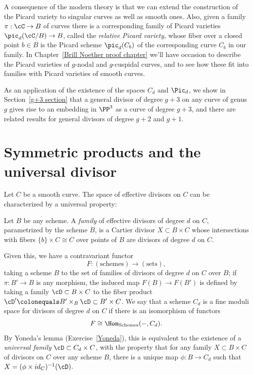 A consequence of the modern theory is that we can extend the
%
construction of the Picard variety to singular curves as well as smooth
ones. Also, given a family $\pi : \cC \to B$ of curves there is a
corresponding family of Picard varieties $\pic_d(\cC/B) \to B$, called
the
\emph{relative Picard variety,}
%
 whose
fiber over a closed point $b\in B$ is the Picard scheme $\pic_d(C_b)$
of the corresponding curve $C_b$ in our family.
In Chapter~\ref{Brill Noether proof chapter} we'll have occasion to
describe the Picard varieties of $g$-nodal and $g$-cuspidal curves, and
to see how these fit into families with Picard varieties of smooth curves.

As an application of the existence of the spaces $C_d$ and $\Pic_d$, we show in Section~\ref{g+3 section} that a general divisor of degree $g+3$ on any curve of genus $g$ gives rise to an embedding in $\PP^3$ as a curve of degree $g+3$, and there are related results for general divisors of degree $g+2$ and $g+1$.

\section{Symmetric products and the universal divisor}\label{symmetric section}

Let $C$ be a smooth curve. The space of effective divisors on $C$ can be characterized by a universal property:

\begin{definition}
Let $B$ be any scheme. A
\emph{family}
of effective divisors of degree
%
$d$ on $C$, parametrized by the scheme $B$, is a
Cartier divisor
%
$X\subset B\times C$ whose intersections with fibers $\{b\} \times C
\cong C$ over points of $B$ are divisors of degree $d$ on $C$.
\end{definition}

Given this, we have a contravariant functor
$$
F : (\textrm{schemes}) \to (\textrm{sets}),
$$
taking a scheme $B$ to the set of families of divisors of degree $d$
on $C$ over $B$; if $\pi : B' \to B$ is any morphism, the induced map
$F(B) \to F(B')$ is defined by taking a family $\cD \subset B \times C$
to the fiber product $\cD' \colonequals  B' \times_B \cD \subset B' \times C$.
We say that a scheme $C_d$ is a
fine moduli space
%
%
for divisors of degree $d$ on $C$ if there is an isomorphism of functors
$$
F \cong \Hom_{\mathrm{Schemes}}( -, C_d).
$$
By
Yoneda's lemma
%
(Exercise~\ref{Yoneda}), this is equivalent to the
existence of a
\emph{universal family}
%
$\cD \subset C_d \times C$,
with the property that for any family $X \subset B \times C$ of
divisors on $C$ over any scheme $B$, there is a unique map $\phi : B
\to C_d$ such that $X = (\phi \times id_{C})^{-1}(\cD)$.

